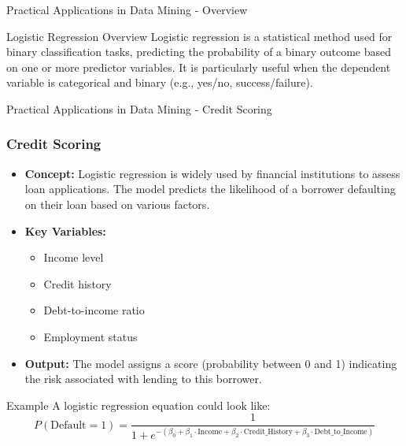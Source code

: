 \documentclass[aspectratio=169]{beamer}
\begin{document}
\begin{frame}[fragile]{Practical Applications in Data Mining - Overview}
    \begin{block}{Logistic Regression Overview}
        Logistic regression is a statistical method used for binary classification tasks, predicting the probability of a binary outcome based on one or more predictor variables. It is particularly useful when the dependent variable is categorical and binary (e.g., yes/no, success/failure).
    \end{block}
\end{frame}

\begin{frame}[fragile]{Practical Applications in Data Mining - Credit Scoring}
    \frametitle{Credit Scoring}
    
    \begin{itemize}
        \item \textbf{Concept:} Logistic regression is widely used by financial institutions to assess loan applications. The model predicts the likelihood of a borrower defaulting on their loan based on various factors.
        \item \textbf{Key Variables:} 
        \begin{itemize}
            \item Income level
            \item Credit history
            \item Debt-to-income ratio
            \item Employment status
        \end{itemize}
        \item \textbf{Output:} The model assigns a score (probability between 0 and 1) indicating the risk associated with lending to this borrower.
    \end{itemize}
    
    \begin{block}{Example}
        A logistic regression equation could look like:
        \begin{equation}
        P(\text{Default} = 1) = \frac{1}{1 + e^{-(\beta_0 + \beta_1 \cdot \text{Income} + \beta_2 \cdot \text{Credit\_History} + \beta_3 \cdot \text{Debt\_to\_Income})}}
        \end{equation}
    \end{block}
\end{frame}
\end{document}
